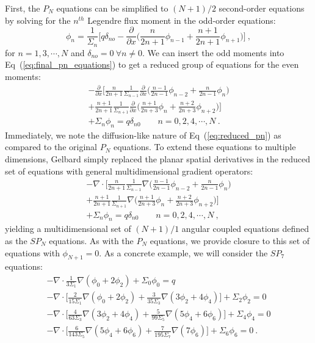 First, the $P_N$ equations can be simplified to $(N+1)/2$ second-order
equations by solving for the $n^{th}$ Legendre flux moment in the
odd-order equations:
\begin{equation}
  \phi_n = \frac{1}{\Sigma_n}\Bigg[ q \delta_{no} -
    \frac{\partial}{\partial x}\Big(\frac{n}{2n+1}\phi_{n-1} +
    \frac{n+1}{2n+1} \phi_{n+1} \Big) \Bigg]\:, 
  \label{eq:odd_moments}
\end{equation}
for $n = 1,3,\cdots,N$ and $\delta_{no} = 0\ \forall n \neq 0$. We can
insert the odd moments into Eq~(\ref{eq:final_pn_equations}) to get a
reduced group of equations for the even moments:
\begin{multline}
  -\frac{\partial}{\partial x}
  \Bigg[\frac{n}{2n+1}\frac{1}{\Sigma_{n-1}} \frac{\partial}{\partial
      x} \Big(\frac{n-1}{2n-1} \phi_{n-2} + \frac{n}{2n-1}\phi_n \Big)
    \\+ \frac{n+1}{2n+1}\frac{1}{\Sigma_{n+1}} \frac{\partial}{\partial
      x} \Big(\frac{n+1}{2n+3}\phi_n + \frac{n+2}{2n+3}\phi_{n+2}\Big)
    \Bigg] \\+ \Sigma_n \phi_n = q \delta_{n0}\ \ \ \ \ \ \ \ \ n =
  0,2,4,\cdots,N\:.
  \label{eq:reduced_pn}
\end{multline}
Immediately, we note the diffusion-like nature of
Eq~(\ref{eq:reduced_pn}) as compared to the original $P_N$
equations. To extend these equations to multiple dimensions, Gelbard
simply replaced the planar spatial derivatives in the reduced set of
equations with general multidimensional gradient operators:
\begin{multline}
  -\nabla \cdot \Bigg[\frac{n}{2n+1}\frac{1}{\Sigma_{n-1}} \nabla
    \Big(\frac{n-1}{2n-1} \phi_{n-2} + \frac{n}{2n-1}\phi_n \Big) \\+
    \frac{n+1}{2n+1}\frac{1}{\Sigma_{n+1}} \nabla
    \Big(\frac{n+1}{2n+3}\phi_n + \frac{n+2}{2n+3}\phi_{n+2}\Big)
    \Bigg] \\+ \Sigma_n \phi_n = q \delta_{n0}\ \ \ \ \ \ \ \ \ n =
  0,2,4,\cdots,N\:,
  \label{eq:spn_equations}
\end{multline}
yielding a multidimensional set of $(N+1)/1$ angular coupled equations
defined as the $SP_N$ equations. As with the $P_N$ equations, we
provide closure to this set of equations with $\phi_{N+1} = 0$. As a
concrete example, we will consider the $SP_7$ equations:
\begin{subequations}
  \begin{gather}
    -\nabla \cdot \frac{1}{3 \Sigma_1} \nabla ( \phi_0 + 2\phi_2 ) +
    \Sigma_0 \phi_0 = q \\ 
    -\nabla \cdot \Bigg[ \frac{2}{15 \Sigma_1} \nabla ( \phi_0 + 2\phi_2
      ) + \frac{3}{35 \Sigma_3}\nabla( 3\phi_2 + 4\phi_4)\Bigg] +
    \Sigma_2 \phi_2 = 0\\
    -\nabla \cdot \Bigg[ \frac{4}{63 \Sigma_3} \nabla ( 3\phi_2 +
      4\phi_4 ) + \frac{5}{99 \Sigma_5}\nabla( 5\phi_4 +
      6\phi_6)\Bigg] + \Sigma_4 \phi_4 = 0\\
    -\nabla \cdot \Bigg[ \frac{6}{143 \Sigma_5} \nabla ( 5\phi_4 +
      6\phi_6 ) + \frac{7}{195 \Sigma_7}\nabla(7\phi_6)\Bigg] +
    \Sigma_6 \phi_6 = 0 \:.
  \end{gather}
  \label{eq:sp7_equations}
\end{subequations}
